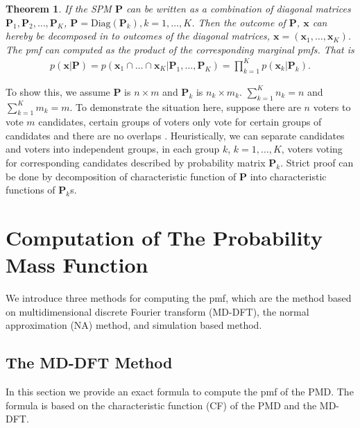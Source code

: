 \documentclass[12pt]{article}
\newcommand{\Pmat}{\mathbf{P}}
\newcommand{\diag}{\textrm{Diag}}
\newtheorem{thm}{Theorem}
\begin{document}
\begin{thm}
If the SPM $\Pmat$ can be written as a combination of diagonal matrices $\Pmat_1, \Pmat_2, \dots, \Pmat_{K}$, $\Pmat = \diag(\Pmat_{k}), k=1,\dots,K$. Then the outcome of $\Pmat$, $\boldsymbol{x}$ can hereby be decomposed in to  outcomes of the diagonal matrices, $\boldsymbol{x} = (\boldsymbol{x}_{1},\dots,\boldsymbol{x}_{K})$. The pmf can computed as the product of the corresponding marginal pmfs. That is
\begin{align*}
p(\boldsymbol{x}|\Pmat)= p(\boldsymbol{x}_{1} \cap \dots \cap \boldsymbol{x}_{K}|\Pmat_1,\dots,\Pmat_{K} )= \prod_{k=1}^K p(\boldsymbol{x}_{k}|\Pmat_{k}).
\end{align*}
\end{thm}
To show this, we assume $\Pmat$ is $n \times m$ and $\Pmat_{k}$ is $n_k \times m_k$. $\sum_{k=1}^K n_k = n$ and $\sum_{k=1}^K m_k = m$. To demonstrate the situation here, suppose there are $n$ voters to vote $m$ candidates, certain groups of voters only vote for certain groups of candidates and there are no overlaps . Heuristically, we can separate candidates and voters into independent groups, in each group $k$, $k = 1,\dots,K$, voters voting for corresponding candidates
described by probability matrix $\Pmat_k$. Strict proof can be done by decomposition of characteristic function of $\Pmat$ into characteristic functions of $\Pmat_{k}$s.



\section{Computation of The Probability Mass Function}\label{sec:CA.driving.study}
We introduce three methods for computing the pmf, which are the method based on multidimensional discrete Fourier transform (MD-DFT), the normal approximation (NA) method, and simulation based method.

\subsection{The MD-DFT Method}
In this section we provide an exact formula to compute the pmf of the PMD. The formula is based on the characteristic function (CF) of the PMD and the MD-DFT.
\end{document}
